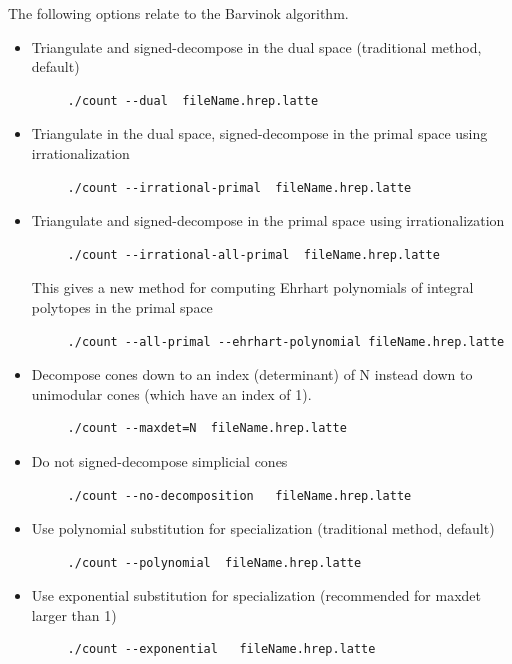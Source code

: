 \documentclass{article}
\begin{document}
The following options relate to the Barvinok algorithm.
\begin{itemize}
\item Triangulate and signed-decompose in the dual space (traditional method, default)
	\begin{verbatim}
     ./count --dual  fileName.hrep.latte
	\end{verbatim} 
\item Triangulate in the dual space, signed-decompose in the primal space using irrationalization
	\begin{verbatim}
     ./count --irrational-primal  fileName.hrep.latte
	\end{verbatim} 
\item Triangulate and signed-decompose in the primal space  using irrationalization
	\begin{verbatim}
     ./count --irrational-all-primal  fileName.hrep.latte
	\end{verbatim} 
	This gives a new method for computing Ehrhart polynomials of integral polytopes 
   in the primal space
	\begin{verbatim}
     ./count --all-primal --ehrhart-polynomial fileName.hrep.latte
	\end{verbatim} 
   
\item  Decompose cones down to an index (determinant) of N instead down to unimodular cones (which have an index of 1).
	\begin{verbatim}
     ./count --maxdet=N  fileName.hrep.latte
	\end{verbatim} 
\item Do not signed-decompose simplicial cones
	\begin{verbatim}
     ./count --no-decomposition   fileName.hrep.latte
	\end{verbatim} 
\item Use polynomial substitution for specialization (traditional method, default)
	\begin{verbatim}
     ./count --polynomial  fileName.hrep.latte
	\end{verbatim} 	
\item Use exponential substitution for specialization (recommended for maxdet larger than 1)
	\begin{verbatim}
     ./count --exponential   fileName.hrep.latte
	\end{verbatim} 	
			
\end{itemize}
\end{document}
